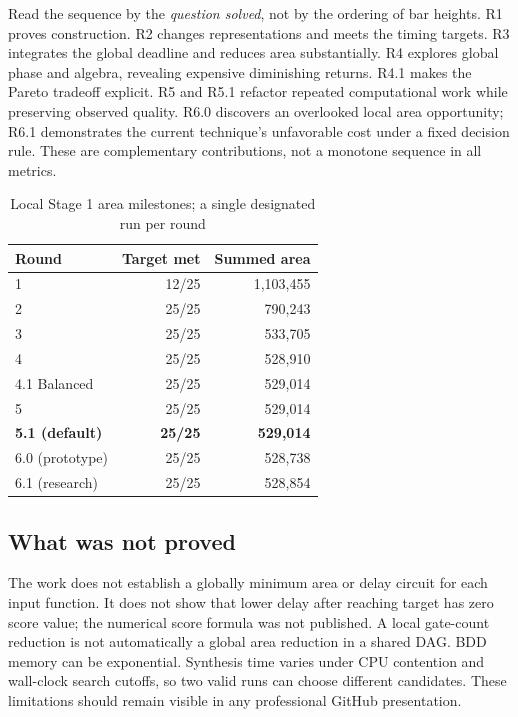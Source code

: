 Read the sequence by the \emph{question solved}, not by the ordering of bar heights. R1 proves construction. R2 changes representations and meets the timing targets. R3 integrates the global deadline and reduces area substantially. R4 explores global phase and algebra, revealing expensive diminishing returns. R4.1 makes the Pareto tradeoff explicit. R5 and R5.1 refactor repeated computational work while preserving observed quality. R6.0 discovers an overlooked local area opportunity; R6.1 demonstrates the current technique's unfavorable cost under a fixed decision rule. These are complementary contributions, not a monotone sequence in all metrics.

\begin{table}[H]\centering\small\caption{Local Stage 1 area milestones; a single designated run per round}\begin{tabular}{@{}lrr@{}}\toprule
Round & Target met & Summed area \\ \midrule
1 &12/25&1,103,455\\
2 &25/25&790,243\\
3 &25/25&533,705\\
4 &25/25&528,910\\
4.1 Balanced &25/25&529,014\\
5 &25/25&529,014\\
\textbf{5.1 (default)}&\textbf{25/25}&\textbf{529,014}\\
6.0 (prototype)&25/25&528,738\\
6.1 (research)&25/25&528,854\\ \bottomrule\end{tabular}\end{table}

\subsection{What was not proved}
The work does not establish a globally minimum area or delay circuit for each input function. It does not show that lower delay after reaching target has zero score value; the numerical score formula was not published. A local gate-count reduction is not automatically a global area reduction in a shared DAG. BDD memory can be exponential. Synthesis time varies under CPU contention and wall-clock search cutoffs, so two valid runs can choose different candidates. These limitations should remain visible in any professional GitHub presentation.

